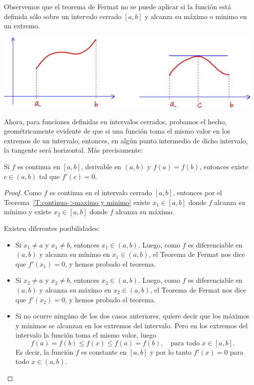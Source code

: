 Observemos que el teorema de Fermat no se puede aplicar si la función está definida sólo sobre un intervalo cerrado $[a,b]$ y alcanza su máximo o mínimo en un extremo.

\medskip
\centerline{\includegraphics[width=.8\textwidth]{pics/rolle.png}}

Ahora, para funciones definidas en intervalos cerrados, probamos el hecho, geométricamente evidente de que si una función toma el mismo valor en los extremos de un intervalo, entonces, en algún punto intermedio de dicho intervalo, la tangente será horizontal. Más precisamente:

\begin{theorem}
    Si $f$ es continua en $[a,b]$, derivable en $(a,b)$ y $f(a)=f(b)$, entonces existe $c\in(a,b)$ tal que $f'(c)=0$.
\end{theorem}

\begin{proof}
    Como $f$ es continua en el intervalo cerrado $[a,b]$, entonces por el Teorema~\ref{T:continua->maximo y minimo} existe $x_1\in[a,b]$ donde $f$ alcanza su mínimo y existe $x_2\in [a,b]$ donde $f$ alcanza su máximo.

Existen diferentes posibilidades:
\begin{itemize}
    \item     Si $x_1\neq a$ y $x_1\neq b$, entonces $x_1\in(a,b)$. Luego, como $f$ es diferenciable en $(a,b)$ y alcanza su mínimo en $x_1\in(a,b)$, el Teorema de Fermat nos dice que $f'(x_1)=0$, y hemos probado el teorema.
    \item  Si $x_2\neq a$ y $x_2\neq b$, entonces $x_2\in(a,b)$. Luego, como $f$ es diferenciable en $(a,b)$ y alcanza su máximo en $x_2\in(a,b)$, el Teorema de Fermat nos dice que $f'(x_2)=0$, y hemos probado el teorema.
    \item Si no ocurre ningúno de los dos casos anteriores, quiere decir que los máximos y mínimos se alcanzan en los extremos del intervalo. Pero en los extremos del intervalo la función toma el mismo valor, luego
    \[
    f(a)=f(b)\le f(x)\le f(a)=f(b), \quad\text{para todo $x\in [a,b]$}.
    \]
    Es decir, la función $f$ es constante en $[a,b]$ y por lo tanto $f'(x)=0$ para todo $x\in(a,b)$.\qedhere
\end{itemize}
\end{proof}

